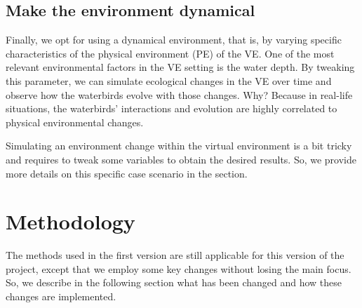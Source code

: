 \subsection{Make the environment dynamical}
Finally, we opt for using a dynamical environment, that is, by varying specific characteristics of the physical environment (PE) of the VE. One of the most relevant environmental factors in the VE setting is the water depth. By tweaking this parameter, we can simulate ecological changes in the VE over time and observe how the waterbirds evolve with those changes. Why? Because in real-life situations, the waterbirds' interactions and evolution are highly correlated to physical environmental changes.

Simulating an environment change within the virtual environment is a bit tricky and requires to tweak some variables to obtain the desired results. So, we provide more details on this specific case scenario in the  section.


\section{Methodology}\label{sec:methodology}
The methods used in the first version are still applicable for this version of the project, except that we employ some key changes without losing the main focus. So, we describe in the following section what has been changed and how these changes are implemented.


